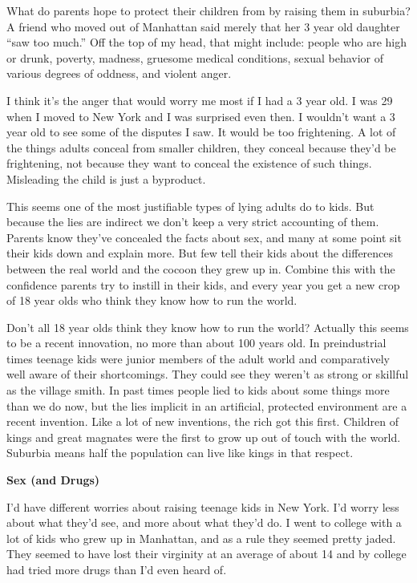 \documentclass[12pt]{book}
\begin{document}
What do parents hope to protect their children from by raising them in
suburbia? A friend who moved out of Manhattan said merely that her 3
year old daughter ``saw too much.'' Off the top of my head, that might
include: people who are high or drunk, poverty, madness, gruesome
medical conditions, sexual behavior of various degrees of oddness, and
violent anger.

I think it's the anger that would worry me most if I had a 3 year old. I
was 29 when I moved to New York and I was surprised even then. I
wouldn't want a 3 year old to see some of the disputes I saw. It would
be too frightening. A lot of the things adults conceal from smaller
children, they conceal because they'd be frightening, not because they
want to conceal the existence of such things. Misleading the child is
just a byproduct.

This seems one of the most justifiable types of lying adults do to kids.
But because the lies are indirect we don't keep a very strict accounting
of them. Parents know they've concealed the facts about sex, and many at
some point sit their kids down and explain more. But few tell their kids
about the differences between the real world and the cocoon they grew up
in. Combine this with the confidence parents try to instill in their
kids, and every year you get a new crop of 18 year olds who think they
know how to run the world.

Don't all 18 year olds think they know how to run the world? Actually
this seems to be a recent innovation, no more than about 100 years old.
In preindustrial times teenage kids were junior members of the adult
world and comparatively well aware of their shortcomings. They could see
they weren't as strong or skillful as the village smith. In past times
people lied to kids about some things more than we do now, but the lies
implicit in an artificial, protected environment are a recent invention.
Like a lot of new inventions, the rich got this first. Children of kings
and great magnates were the first to grow up out of touch with the
world. Suburbia means half the population can live like kings in that
respect.

\textbf{Sex (and Drugs)}

I'd have different worries about raising teenage kids in New York. I'd
worry less about what they'd see, and more about what they'd do. I went
to college with a lot of kids who grew up in Manhattan, and as a rule
they seemed pretty jaded. They seemed to have lost their virginity at an
average of about 14 and by college had tried more drugs than I'd even
heard of.
\end{document}
